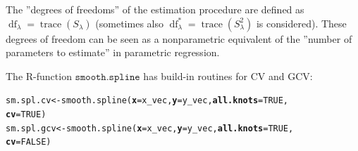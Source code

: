 \documentclass[14pt]{extreport}\usepackage[]{graphicx}\usepackage[]{xcolor}
\makeatletter
\newcommand{\hlnum}[1]{\textcolor[rgb]{0.69,0.494,0}{#1}}%
\newcommand{\hlstd}[1]{\textcolor[rgb]{0,0,0}{#1}}%
\newcommand{\hlkwb}[1]{\textcolor[rgb]{0,0.341,0.682}{#1}}%
\newcommand{\hlkwc}[1]{\textcolor[rgb]{0,0,0}{\textbf{#1}}}%
\newcommand{\hlkwd}[1]{\textcolor[rgb]{0.004,0.004,0.506}{#1}}%
\newenvironment{kframe}{%
 \def\at@end@of@kframe{}%
 \ifinner\ifhmode%
  \def\at@end@of@kframe{\end{minipage}}%
  \begin{minipage}{\columnwidth}%
 \fi\fi%
 \def\FrameCommand##1{\hskip\@totalleftmargin \hskip-\fboxsep
 \colorbox{shadecolor}{##1}\hskip-\fboxsep
     \hskip-\linewidth \hskip-\@totalleftmargin \hskip\columnwidth}%
 \MakeFramed {\advance\hsize-\width
   \@totalleftmargin\z@ \linewidth\hsize
   \@setminipage}}%
 {\par\unskip\endMakeFramed%
 \at@end@of@kframe}
\newenvironment{knitrout}{}{} %
\makeatother
\begin{document}
The ''degrees of freedoms'' of the estimation procedure are defined as $\operatorname{df}_\lambda=\operatorname{trace}(S_\lambda)$ (sometimes also $\operatorname{df}_\lambda^*=\operatorname{trace}(S_\lambda^2)$ is considered). These degrees of freedom can be seen as a nonparametric equivalent of the ''number of parameters to estimate'' in parametric regression.

\bigskip
\bigskip

The R-function $\texttt{smooth.spline}$ has build-in routines for CV and GCV:
\begin{knitrout}
\color{fgcolor}\begin{kframe}
\begin{alltt}
\hlstd{sm.spl.cv}  \hlkwb{<-} \hlkwd{smooth.spline}\hlstd{(}\hlkwc{x}\hlstd{=x_vec,}\hlkwc{y}\hlstd{=y_vec,}\hlkwc{all.knots}\hlstd{=}\hlnum{TRUE}\hlstd{,}
                            \hlkwc{cv}\hlstd{=}\hlnum{TRUE}\hlstd{)}
\hlstd{sm.spl.gcv} \hlkwb{<-} \hlkwd{smooth.spline}\hlstd{(}\hlkwc{x}\hlstd{=x_vec,}\hlkwc{y}\hlstd{=y_vec,}\hlkwc{all.knots}\hlstd{=}\hlnum{TRUE}\hlstd{,}
                            \hlkwc{cv}\hlstd{=}\hlnum{FALSE}\hlstd{)}
\end{alltt}
\end{kframe}
\end{knitrout}

\newpage
\end{document}
